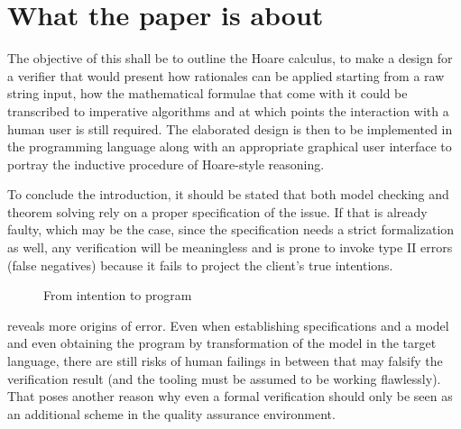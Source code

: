 \section{What the paper is about}
The objective of this \paper{} shall be to outline the Hoare calculus, to make a design for a verifier that would present how rationales can be applied starting from a raw string input, how the mathematical formulae that come with it could be transcribed to imperative algorithms and at which points the interaction with a human user is still required. The elaborated design is then to be implemented in the  programming language along with an appropriate graphical user interface to portray the inductive procedure of Hoare-style reasoning.

To conclude the introduction, it should be stated that both model checking and theorem solving rely on a proper specification of the issue. If that is already faulty, which may be the case, since the specification needs a strict formalization as well, any verification will be meaningless and is prone to invoke type II errors (false negatives) because it fails to project the client's true intentions.


\begin{figure}
	\centering
	
	
	
	\caption{From intention to program}
	\label{fig:taskToProgram}
\end{figure}

 reveals more origins of error. Even when establishing specifications and a model and even obtaining the program by transformation of the model in the target language, there are still risks of human failings in between that may falsify the verification result (and the tooling must be assumed to be working flawlessly). That poses another reason why even a formal verification should only be seen as an additional scheme in the quality assurance environment.

%

